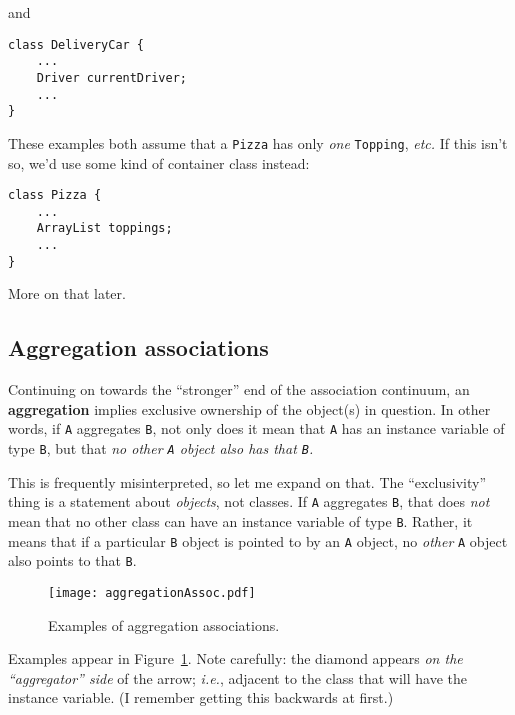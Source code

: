 and

\begin{Verbatim}[fontsize=\scriptsize,samepage=true,frame=single]
class DeliveryCar {
    ...
    Driver currentDriver;
    ...
}
\end{Verbatim}

These examples both assume that a \texttt{Pizza} has only \textit{one}
\texttt{Topping}, \textit{etc.} If this isn't so, we'd use some kind of
container class instead:

\begin{Verbatim}[fontsize=\scriptsize,samepage=true,frame=single]
class Pizza {
    ...
    ArrayList toppings;
    ...
}
\end{Verbatim}

More on that later.

\subsection{Aggregation associations}

Continuing on towards the ``stronger'' end of the association continuum, an
\textbf{aggregation} implies exclusive ownership of the object(s) in question.
In other words, if \texttt{A} aggregates \texttt{B}, not only does it mean
that \texttt{A} has an instance variable of type \texttt{B}, but that
\textit{no other \texttt{A} object also has that \texttt{B}.}

This is frequently misinterpreted, so let me expand on that. The
``exclusivity'' thing is a statement about \textit{objects}, not classes. If
\texttt{A} aggregates \texttt{B}, that does \textit{not} mean that no other
class can have an instance variable of type \texttt{B}. Rather, it means that
if a particular \texttt{B} object is pointed to by an \texttt{A} object, no
\textit{other} \texttt{A} object also points to that \texttt{B}.

\begin{figure}[ht]
\centering
\texttt{[image: aggregationAssoc.pdf]}   %
\caption{Examples of aggregation associations.}
\label{fig:aggregationAssoc}
\end{figure}


Examples appear in Figure~\ref{fig:aggregationAssoc}. Note carefully: the
diamond appears \textit{on the ``aggregator'' side} of the arrow;
\textit{i.e.}, adjacent to the class that will have the instance variable. (I
remember getting this backwards at first.)

